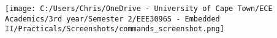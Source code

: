 \texttt{[image: C:/Users/Chris/OneDrive - University of Cape Town/ECE Academics/3rd year/Semester 2/EEE3096S - Embedded II/Practicals/Screenshots/commands\_screenshot.png]}
